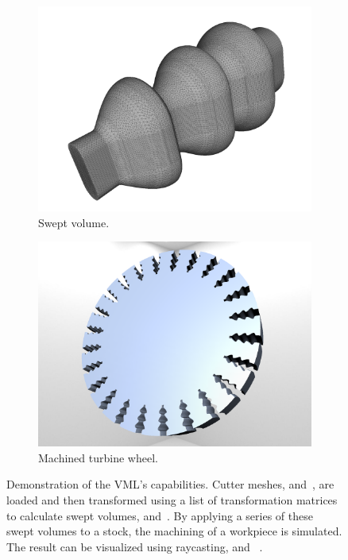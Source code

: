 \begin{figure}[h]
\begin{subfigure}[t]{0.32\textwidth}
			\centering
			\includegraphics[width=\textwidth]{images/turbine_swept}
			\caption{Swept volume.}
			\label{fig:turbine_swept}
		\end{subfigure}
		\begin{subfigure}[t]{0.32\textwidth}
			\centering
			\includegraphics[width=\textwidth]{images/turbine_complete}
			\caption{Machined turbine wheel.}
			\label{fig:turbine_complete}
		\end{subfigure}
	\caption{
		Demonstration of the VML's capabilities.
		Cutter meshes, \cf {} and~, are loaded and then transformed using a list of transformation matrices to calculate swept volumes, \cf {} and~.
		By applying a series of these swept volumes to a stock, the machining of a workpiece is simulated.
		The result can be visualized using raycasting, \cf {} and~ \cite{engrave_report}.
	}
	\label{fig:vml_demo}
\end{figure}



